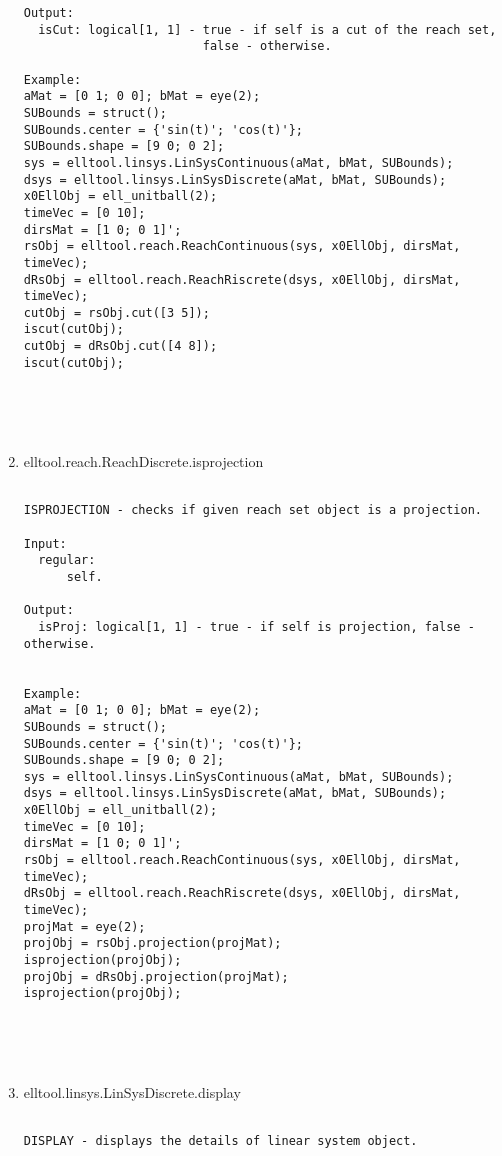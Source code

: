 \begin{enumerate}
\begin{lstlisting}
Output:
  isCut: logical[1, 1] - true - if self is a cut of the reach set,
                         false - otherwise.

Example:
aMat = [0 1; 0 0]; bMat = eye(2);
SUBounds = struct();
SUBounds.center = {'sin(t)'; 'cos(t)'};
SUBounds.shape = [9 0; 0 2];
sys = elltool.linsys.LinSysContinuous(aMat, bMat, SUBounds);
dsys = elltool.linsys.LinSysDiscrete(aMat, bMat, SUBounds);
x0EllObj = ell_unitball(2);
timeVec = [0 10];
dirsMat = [1 0; 0 1]';
rsObj = elltool.reach.ReachContinuous(sys, x0EllObj, dirsMat, timeVec);
dRsObj = elltool.reach.ReachRiscrete(dsys, x0EllObj, dirsMat, timeVec);
cutObj = rsObj.cut([3 5]);
iscut(cutObj);
cutObj = dRsObj.cut([4 8]);
iscut(cutObj);





\end{lstlisting}
\fontfamily{\familydefault}
\selectfont
\item {elltool.reach.ReachDiscrete.isprojection}
\selectfont
\begin{lstlisting}

ISPROJECTION - checks if given reach set object is a projection.

Input:
  regular:
      self.

Output:
  isProj: logical[1, 1] - true - if self is projection, false - otherwise.


Example:
aMat = [0 1; 0 0]; bMat = eye(2);
SUBounds = struct();
SUBounds.center = {'sin(t)'; 'cos(t)'};
SUBounds.shape = [9 0; 0 2];
sys = elltool.linsys.LinSysContinuous(aMat, bMat, SUBounds);
dsys = elltool.linsys.LinSysDiscrete(aMat, bMat, SUBounds);
x0EllObj = ell_unitball(2);
timeVec = [0 10];
dirsMat = [1 0; 0 1]';
rsObj = elltool.reach.ReachContinuous(sys, x0EllObj, dirsMat, timeVec);
dRsObj = elltool.reach.ReachRiscrete(dsys, x0EllObj, dirsMat, timeVec);
projMat = eye(2);
projObj = rsObj.projection(projMat);
isprojection(projObj);
projObj = dRsObj.projection(projMat);
isprojection(projObj);





\end{lstlisting}
\fontfamily{\familydefault}
\selectfont
\item {elltool.linsys.LinSysDiscrete.display}
\selectfont
\begin{lstlisting}

DISPLAY - displays the details of linear system object.


\end{lstlisting}
\end{enumerate}
